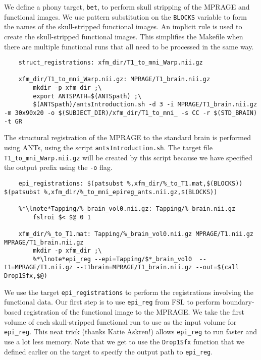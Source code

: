 We define a phony target, \texttt{bet}, to perform skull stripping of
the MPRAGE and functional images.  We use pattern substitution
on the \texttt{BLOCKS} variable to form the names of the
skull-stripped functional images.  An implicit rule is used to
create the skull-stripped functional images. This simplifies the
Makefile when there are multiple functional runs that all need to be
processed in the same way.

\begin{lstlisting}
	struct_registrations: xfm_dir/T1_to_mni_Warp.nii.gz

	xfm_dir/T1_to_mni_Warp.nii.gz: MPRAGE/T1_brain.nii.gz 
		mkdir -p xfm_dir ;\
		export ANTSPATH=$(ANTSpath) ;\
		$(ANTSpath)/antsIntroduction.sh -d 3 -i MPRAGE/T1_brain.nii.gz -m 30x90x20 -o $(SUBJECT_DIR)/xfm_dir/T1_to_mni_ -s CC -r $(STD_BRAIN) -t GR
\end{lstlisting}
The structural registration of the MPRAGE to the standard brain is
performed using ANTs, using the script
\texttt{antsIntroduction.sh}. The target file
\texttt{T1_to_mni_Warp.nii.gz} will be created by this script because
we have specified the output prefix using the \texttt{-o} flag.

\begin{lstlisting}
	epi_registrations: $(patsubst %,xfm_dir/%_to_T1.mat,$(BLOCKS)) $(patsubst %,xfm_dir/%_to_mni_epireg_ants.nii.gz,$(BLOCKS))

	%*\lnote*Tapping/%_brain_vol0.nii.gz: Tapping/%_brain.nii.gz
		fslroi $< $@ 0 1

	xfm_dir/%_to_T1.mat: Tapping/%_brain_vol0.nii.gz MPRAGE/T1.nii.gz MPRAGE/T1_brain.nii.gz
		mkdir -p xfm_dir ;\
		%*\lnote*epi_reg --epi=Tapping/$*_brain_vol0  --t1=MPRAGE/T1.nii.gz --t1brain=MPRAGE/T1_brain.nii.gz --out=$(call Drop1Sfx,$@)
\end{lstlisting}
We use the target \texttt{epi_registrations} to perform the
registrations involving the functional data. Our first step is to use
\texttt{epi_reg} from FSL to perform boundary-based registration of
the functional image to the MPRAGE. \lnum{8} We take the
first volume of each skull-stripped functional run to use as the input
volume for \texttt{epi_reg}. This neat trick (thanks Katie Askren!)
allows \texttt{epi_reg} to run faster and use a lot less
memory. \lnum{9} Note that we get to use the \texttt{Drop1Sfx}
function that we defined earlier on the target to specify the output
path to \texttt{epi_reg}.


